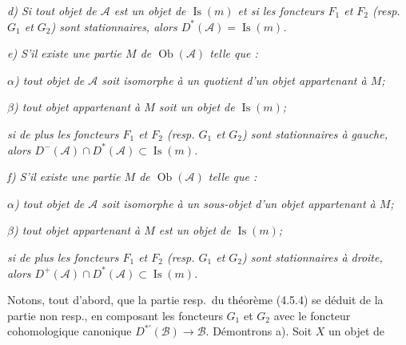 \noindent\textit{d) Si tout objet de $\mathcal A$ est un objet de
$\operatorname{Is}(m)$ et si les foncteurs $F_1$ et $F_2$ (resp. $G_1$ et
$G_2$) sont stationnaires, alors
$D^*(\mathcal A)=\operatorname{Is}(m)$.}

\noindent\textit{e) S'il existe une partie $M$ de
$\operatorname{Ob}(\mathcal A)$ telle que :}

\noindent\textit{$\alpha$) tout objet de $\mathcal A$ soit isomorphe à un
quotient d'un objet appartenant à $M$;}

\noindent\textit{$\beta$) tout objet appartenant à $M$ soit un objet de
$\operatorname{Is}(m)$;}

\noindent\textit{si de plus les foncteurs $F_1$ et $F_2$ (resp. $G_1$ et
$G_2$) sont stationnaires à gauche, alors
$D^-(\mathcal A)\cap D^*(\mathcal A)\subset\operatorname{Is}(m)$.}

\noindent\textit{f) S'il existe une partie $M$ de
$\operatorname{Ob}(\mathcal A)$ telle que :}

\noindent\textit{$\alpha$) tout objet de $\mathcal A$ soit isomorphe à un
sous-objet d'un objet appartenant à $M$;}

\noindent\textit{$\beta$) tout objet appartenant à $M$ est un objet de
$\operatorname{Is}(m)$;}

\noindent\textit{si de plus les foncteurs $F_1$ et $F_2$ (resp. $G_1$ et
$G_2$) sont stationnaires à droite, alors
$D^+(\mathcal A)\cap D^*(\mathcal A)\subset\operatorname{Is}(m)$.}

Notons, tout d'abord, que la partie resp.\ du théorème (4.5.4) se déduit de
la partie non resp., en composant les foncteurs $G_1$ et $G_2$ avec le
foncteur cohomologique canonique
$D^{*'}(\mathcal B)\longrightarrow\mathcal B$. Démontrons a). Soit $X$ un
objet de
\endgroup
